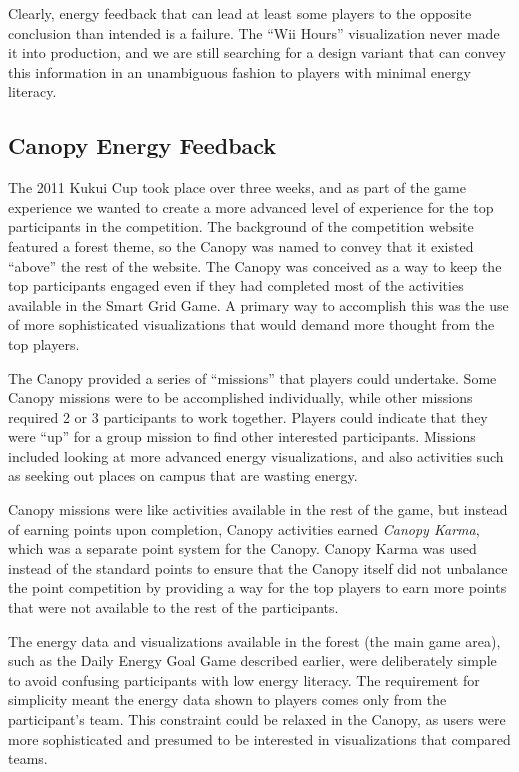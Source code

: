 \documentclass[10pt, conference, compsocconf]{IEEEtran-old}
\begin{document}
Clearly, energy feedback that can lead at least some players to the opposite conclusion than intended is a failure. The ``Wii Hours'' visualization never made it into production, and we are still searching for a design variant that can convey this information in an unambiguous fashion to players with minimal energy literacy.


\subsection{Canopy Energy Feedback}

The 2011 Kukui Cup took place over three weeks, and as part of the game experience we wanted to create a more advanced level of experience for the top participants in the competition. The background of the competition website featured a forest theme, so the Canopy was named to convey that it existed ``above'' the rest of the website. The Canopy was conceived as a way to keep the top participants engaged even if they had completed most of the activities available in the Smart Grid Game. A primary way to accomplish this was the use of more sophisticated visualizations that would demand more thought from the top players. 

The Canopy provided a series of ``missions'' that players could undertake. Some Canopy missions were to be accomplished individually, while other missions required 2 or 3 participants to work together. Players could indicate that they were ``up'' for a group mission to find other interested participants. Missions included looking at more advanced energy visualizations, and also activities such as seeking out places on campus that are wasting energy.

Canopy missions were like activities available in the rest of the game, but instead of earning points upon completion, Canopy activities earned \emph{Canopy Karma}, which was a separate point system for the Canopy. Canopy Karma was used instead of the standard points to ensure that the Canopy itself did not unbalance the point competition by providing a way for the top players to earn more points that were not available to the rest of the participants.

The energy data and visualizations available in the forest (the main game area), such as the Daily Energy Goal Game described earlier, were deliberately simple to avoid confusing participants with low energy literacy. The requirement for simplicity meant the energy data shown to players comes only from the participant's team. This constraint could be relaxed in the Canopy, as users were more sophisticated and presumed to be interested in visualizations that compared teams.
\end{document}
